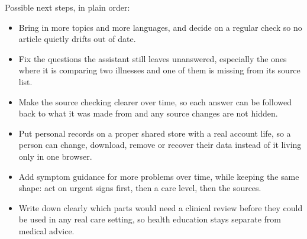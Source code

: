 Possible next steps, in plain order:

\begin{itemize}
  \item Bring in more topics and more languages, and decide on a regular check so no article quietly drifts out of date.
  \item Fix the questions the assistant still leaves unanswered, especially the ones where it is comparing two illnesses and one of them is missing from its source list.
  \item Make the source checking clearer over time, so each answer can be followed back to what it was made from and any source changes are not hidden.
  \item Put personal records on a proper shared store with a real account life, so a person can change, download, remove or recover their data instead of it living only in one browser.
  \item Add symptom guidance for more problems over time, while keeping the same shape: act on urgent signs first, then a care level, then the sources.
  \item Write down clearly which parts would need a clinical review before they could be used in any real care setting, so health education stays separate from medical advice.
\end{itemize}
